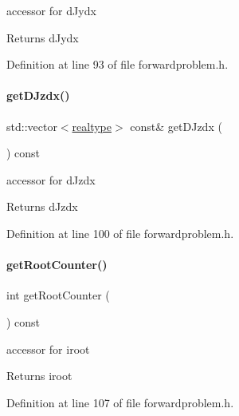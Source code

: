 accessor for d\+Jydx \begin{DoxyReturn}{Returns}
d\+Jydx 
\end{DoxyReturn}


Definition at line 93 of file forwardproblem.\+h.

\mbox{\label{classamici_1_1_forward_problem_a3ea9fa40cc5f7ce1f4e1bd0a6db0f785}} 
\paragraph{\texorpdfstring{get\+D\+Jzdx()}{getDJzdx()}}
{\footnotesize\ttfamily std\+::vector$<$\mbox{\hyperlink{namespaceamici_a1bdce28051d6a53868f7ccbf5f2c14a3}{realtype}}$>$ const\& get\+D\+Jzdx (\begin{DoxyParamCaption}{ }\end{DoxyParamCaption}) const}

accessor for d\+Jzdx \begin{DoxyReturn}{Returns}
d\+Jzdx 
\end{DoxyReturn}


Definition at line 100 of file forwardproblem.\+h.

\mbox{\label{classamici_1_1_forward_problem_a9ba8c1d4ef2ba23e6f4faaaefd28aae9}} 
\paragraph{\texorpdfstring{get\+Root\+Counter()}{getRootCounter()}}
{\footnotesize\ttfamily int get\+Root\+Counter (\begin{DoxyParamCaption}{ }\end{DoxyParamCaption}) const}

accessor for iroot \begin{DoxyReturn}{Returns}
iroot 
\end{DoxyReturn}


Definition at line 107 of file forwardproblem.\+h.


